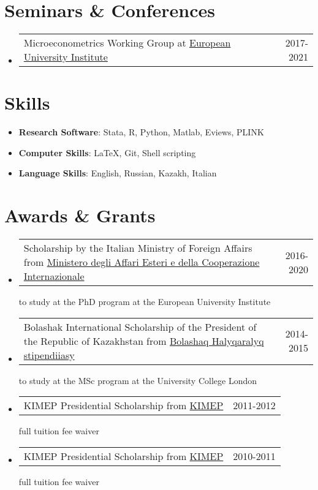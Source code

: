 \documentclass[a4, 11pt]{article}
\makeatletter
\newcommand{\resumeOtherHeading}[2]{
      \item
      \begin{tabularx}{0.97\textwidth}{X@{\extracolsep{2em}}r}
        #1 & #2
      \end{tabularx}
    }
\newcommand{\resumeSubHeadingListStart}{\begin{itemize}[leftmargin=0.15in, label={}]}
\newcommand{\resumeSubHeadingListEnd}{\end{itemize}}
\makeatother
\begin{document}
    \section*{Seminars \& Conferences}
  \resumeSubHeadingListStart
        \resumeOtherHeading
          {{Microeconometrics Working Group} at \href{https://www.eui.eu}{European University Institute} }
          { 2017-2021 }
    \resumeSubHeadingListEnd


    \section{Skills}\begin{itemize}[leftmargin=0.15in, label = {}]
      \item \small{ \textbf{Research Software}: Stata, R, Python, Matlab, Eviews, PLINK}
      \item \small{ \textbf{Computer Skills}: LaTeX, Git, Shell scripting}
      \item \small{ \textbf{Language Skills}: English, Russian, Kazakh, Italian}
  \end{itemize}


    \section{Awards \& Grants}
  \resumeSubHeadingListStart
        \resumeOtherHeading
          {  {Scholarship by the Italian Ministry of Foreign Affairs} from \href{https://www.esteri.it/mae/en/}{Ministero degli Affari Esteri e della Cooperazione Internazionale} }
          { 2016-2020 }
          {to study at the PhD program at the European University Institute}
        \resumeOtherHeading
          {  {Bolashak International Scholarship of the President of the Republic of Kazakhstan} from \href{https://bolashak.gov.kz/ru}{Bolashaq Halyqaralyq stipendiiasy} }
          { 2014-2015 }
          {to study at the MSc program at the University College London}
        \resumeOtherHeading
          {  {KIMEP Presidential Scholarship} from \href{https://www.kimep.kz/ru/}{KIMEP} }
          { 2011-2012 }
          {full tuition fee waiver}
        \resumeOtherHeading
          {  {KIMEP Presidential Scholarship} from \href{https://www.kimep.kz/ru/}{KIMEP} }
          { 2010-2011 }
          {full tuition fee waiver}
    \resumeSubHeadingListEnd

    
\end{document}
